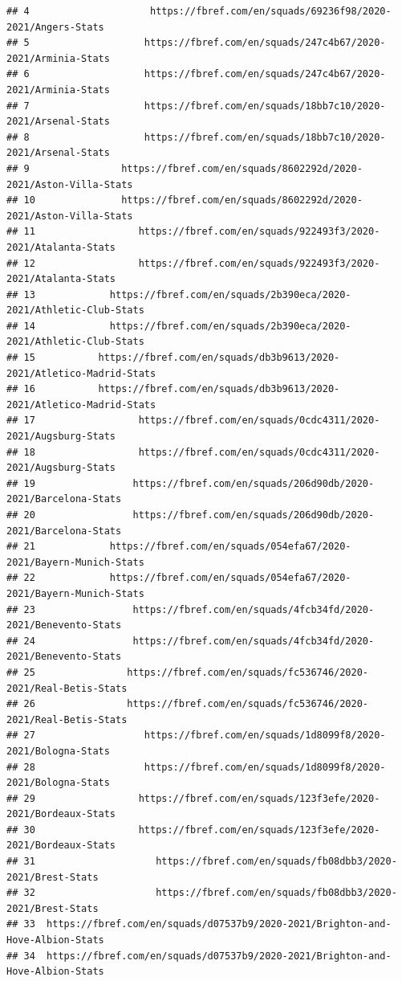 \documentclass[
]{book}
\theoremstyle{definition}
\theoremstyle{definition}
\theoremstyle{definition}
\theoremstyle{definition}
\theoremstyle{remark}
\begin{document}
\begin{verbatim}
## 4                     https://fbref.com/en/squads/69236f98/2020-2021/Angers-Stats
## 5                    https://fbref.com/en/squads/247c4b67/2020-2021/Arminia-Stats
## 6                    https://fbref.com/en/squads/247c4b67/2020-2021/Arminia-Stats
## 7                    https://fbref.com/en/squads/18bb7c10/2020-2021/Arsenal-Stats
## 8                    https://fbref.com/en/squads/18bb7c10/2020-2021/Arsenal-Stats
## 9                https://fbref.com/en/squads/8602292d/2020-2021/Aston-Villa-Stats
## 10               https://fbref.com/en/squads/8602292d/2020-2021/Aston-Villa-Stats
## 11                  https://fbref.com/en/squads/922493f3/2020-2021/Atalanta-Stats
## 12                  https://fbref.com/en/squads/922493f3/2020-2021/Atalanta-Stats
## 13             https://fbref.com/en/squads/2b390eca/2020-2021/Athletic-Club-Stats
## 14             https://fbref.com/en/squads/2b390eca/2020-2021/Athletic-Club-Stats
## 15           https://fbref.com/en/squads/db3b9613/2020-2021/Atletico-Madrid-Stats
## 16           https://fbref.com/en/squads/db3b9613/2020-2021/Atletico-Madrid-Stats
## 17                  https://fbref.com/en/squads/0cdc4311/2020-2021/Augsburg-Stats
## 18                  https://fbref.com/en/squads/0cdc4311/2020-2021/Augsburg-Stats
## 19                 https://fbref.com/en/squads/206d90db/2020-2021/Barcelona-Stats
## 20                 https://fbref.com/en/squads/206d90db/2020-2021/Barcelona-Stats
## 21             https://fbref.com/en/squads/054efa67/2020-2021/Bayern-Munich-Stats
## 22             https://fbref.com/en/squads/054efa67/2020-2021/Bayern-Munich-Stats
## 23                 https://fbref.com/en/squads/4fcb34fd/2020-2021/Benevento-Stats
## 24                 https://fbref.com/en/squads/4fcb34fd/2020-2021/Benevento-Stats
## 25                https://fbref.com/en/squads/fc536746/2020-2021/Real-Betis-Stats
## 26                https://fbref.com/en/squads/fc536746/2020-2021/Real-Betis-Stats
## 27                   https://fbref.com/en/squads/1d8099f8/2020-2021/Bologna-Stats
## 28                   https://fbref.com/en/squads/1d8099f8/2020-2021/Bologna-Stats
## 29                  https://fbref.com/en/squads/123f3efe/2020-2021/Bordeaux-Stats
## 30                  https://fbref.com/en/squads/123f3efe/2020-2021/Bordeaux-Stats
## 31                     https://fbref.com/en/squads/fb08dbb3/2020-2021/Brest-Stats
## 32                     https://fbref.com/en/squads/fb08dbb3/2020-2021/Brest-Stats
## 33  https://fbref.com/en/squads/d07537b9/2020-2021/Brighton-and-Hove-Albion-Stats
## 34  https://fbref.com/en/squads/d07537b9/2020-2021/Brighton-and-Hove-Albion-Stats

\end{verbatim}
\end{document}
